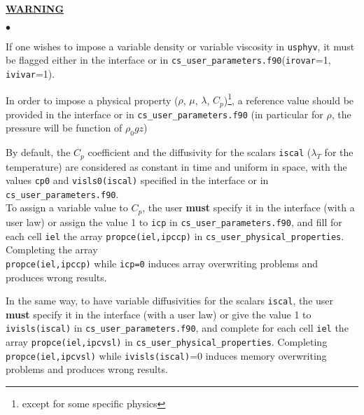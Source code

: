 {{{{\bf \underline{WARNING}}\label{sec:prg_propvar}%
\begin{list}{$\bullet$}{}
\item If one wishes to impose a variable density or variable viscosity in
      \texttt{usphyv}, it must be flagged either in the interface or in
      \texttt{cs\_user\_parameters.f90}(\texttt{irovar}=1, \texttt{ivivar}=1).
\item In order to impose a physical property ($\rho$, $\mu$,
      $\lambda$, $C_p$)\footnote{except for some specific physics}, a reference
      value should be provided in the interface or in \texttt{cs\_user\_parameters.f90} (in
      particular for $\rho$, the pressure will be function of $\rho_0 gz$)
\item By default, the $C_p$ coefficient and the
      diffusivity for the scalars \texttt{iscal} ($\lambda_T$ for the
      temperature) are considered as constant in time and uniform in
      space, with the values \texttt{cp0} and \texttt{visls0(iscal)}
      specified in the interface or in \texttt{cs\_user\_parameters.f90}.\\
To assign a variable value to $C_p$, the user \textbf{must} specify it in the
      interface (with a user law) or assign the value 1 to \texttt{icp} in \texttt{cs\_user\_parameters.f90},
      and fill for each cell \texttt{iel} the array
      \texttt{propce(iel,ipccp)} in \texttt{cs\_user\_physical\_properties}. Completing the array
      \\\texttt{propce(iel,ipccp)} while \texttt{icp=0} induces array
      overwriting problems and produces wrong results.

\item In the same way, to have variable diffusivities for the scalars
      \texttt{iscal}, the user \textbf{must} specify it in the interface (with a user law) or give the value
      1 to \texttt{ivisls(iscal)} in \texttt{cs\_user\_parameters.f90}, and complete for each cell
      \texttt{iel} the array \texttt{propce(iel,ipcvsl)} in \texttt{cs\_user\_physical\_properties}.
      Completing \texttt{propce(iel,ipcvsl)} while \texttt{ivisls(iscal)}=0
      induces memory overwriting problems and produces wrong results.\\


\end{list}}}}
